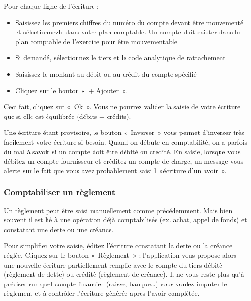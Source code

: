 \documentclass[a4paper,10pt,oneside,french]{sphinxmanual}
\begin{document}
\sphinxAtStartPar
Pour chaque ligne de l’écriture :
\begin{itemize}
\item {} 
\sphinxAtStartPar
Saisissez les premiers chiffres du numéro du compte devant être mouvementé et sélectionnez\sphinxhyphen{}le dans votre plan comptable. Un compte doit exister dans le plan comptable de l’exercice pour être mouvementable

\item {} 
\sphinxAtStartPar
Si demandé, sélectionnez le tiers et le code analytique de rattachement

\item {} 
\sphinxAtStartPar
Saisissez le montant au débit ou au crédit du compte spécifié

\item {} 
\sphinxAtStartPar
Cliquez sur le bouton « + Ajouter ».

\end{itemize}

\sphinxAtStartPar
Ceci fait, cliquez sur « Ok ». Vous ne pourrez valider la saisie de votre écriture que si elle est équilibrée (débits = crédits).

\sphinxAtStartPar
{}

\sphinxAtStartPar
Une écriture étant provisoire, le bouton « Inverser » vous permet d’inverser très facilement votre écriture si besoin.
Quand on débute en comptabilité, on a parfois du mal à savoir si un compte doit être débité ou crédité.
En saisie, lorsque vous débitez un compte fournisseur et créditez un compte de charge, un message vous alerte sur le fait que vous avez probablement saisi l »écriture d’un avoir ».


\subsubsection{Comptabiliser un règlement}
\label{\detokenize{accounting/entity:comptabiliser-un-reglement}}
\sphinxAtStartPar
Un règlement peut être saisi manuellement comme précédemment. Mais bien souvent il est lié à une opération déjà comptabilisée  (ex. achat, appel de fonds) et constatant une dette ou une créance.

\sphinxAtStartPar
Pour simplifier votre saisie, éditez l’écriture constatant la dette ou la créance réglée. Cliquez sur le bouton « Règlement » : l’application vous propose alors une nouvelle écriture partiellement remplie avec le compte du tiers débité (règlement de dette) ou crédité (règlement de créance).
Il ne vous reste plus qu’à préciser sur quel compte financier (caisse, banque…) vous voulez imputer le règlement et à contrôler l’écriture générée après l’avoir complétée.
\end{document}
